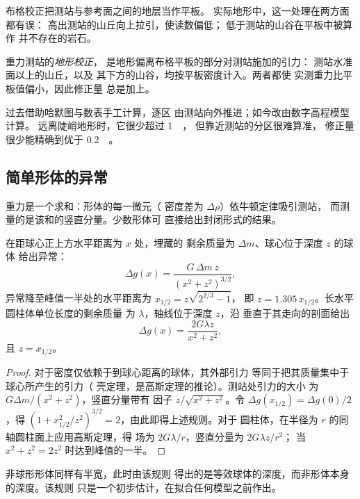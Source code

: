 布格校正把测站与参考面之间的地层当作平板。
实际地形中，这一处理在两方面都有误：
高出测站的山丘向上拉引，使读数偏低；
低于测站的山谷在平板中被算作
并不存在的岩石。

\begin{definition}[地形校正]\label{def:b3:field-lab-methods-3:terrain}
重力测站的\emph{地形校正}，
是地形偏离布格平板的部分对测站施加的引力：
测站水准面以上的山丘，以及
其下方的山谷，均按平板密度计入。两者都使
实测重力比平板值偏小，因此修正量
总是加上。
\end{definition}

过去借助哈默图与数表手工计算，逐区
由测站向外推进；如今改由数字高程模型计算。
远离陡峭地形时，它很少超过 \qty{1}{\milli\gal}，
但靠近测站的分区很难算准，
修正量很少能精确到优于 \qty{0.2}{\milli\gal}。

\subsection{简单形体的异常}

重力是一个求和：形体的每一微元（
密度差为 $\Delta\rho$）依牛顿定律吸引测站，
而测量的是该和的竖直分量。少数形体可
直接给出封闭形式的结果。

\begin{theorem}[球体与水平圆柱体]\label{thm:b3:field-lab-methods-3:sphere}
在距球心正上方水平距离为 $x$ 处，埋藏的
剩余质量为 $\Delta m$、球心位于深度 $z$ 的球体
给出异常：
\[
\Delta g(x) = \frac{G\,\Delta m\,z}{(x^2 + z^2)^{3/2}} ,
\]
异常降至峰值一半处的水平距离为 $x_{1/2} = z\sqrt{2^{2/3} - 1}$，
即 $z = 1.305\,x_{1/2}$。长水平圆柱体单位长度的剩余质量
为 $\lambda$，轴线位于深度 $z$，沿
垂直于其走向的剖面给出
\[
\Delta g(x) = \frac{2G\lambda z}{x^2 + z^2} ,
\]
且 $z = x_{1/2}$。
\end{theorem}

\begin{proof}
对于密度仅依赖于到球心距离的球体，其外部引力
等同于把其质量集中于球心所产生的引力（
壳定理，是高斯定理的推论）。测站处引力的大小
为 $G\Delta m/(x^2 + z^2)$，竖直分量带有
因子 $z/\sqrt{x^2 + z^2}$。令 $\Delta g(x_{1/2}) =
\Delta g(0)/2$，得 $(1 + x_{1/2}^2/z^2)^{3/2} = 2$，由此即得上述规则。对于
圆柱体，在半径为 $r$ 的同轴圆柱面上应用高斯定理，得
场为 $2G\lambda/r$，竖直分量为 $2G\lambda z/r^2$；
当 $x^2 + z^2 = 2z^2$ 时达到峰值的一半。
\end{proof}

非球形形体同样有半宽，此时由该规则
得出的是等效球体的深度，而非形体本身的深度。该规则
只是一个初步估计，在拟合任何模型之前作出。

